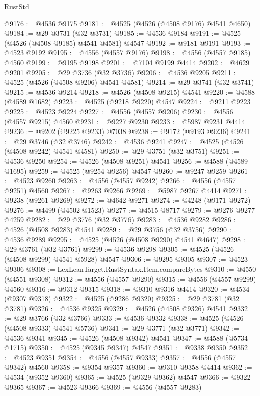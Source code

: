 \begin{lexlean}{RustStd}
\begin{coremodule}
{\begin{coremodule}
{{{{{{{{{{{{{{{{{{{{{{{{{{{{{{{{{{{{{{{{{{{{{{{{{{{{{{{@9176 := @4536 @9175
@9181 := @4525 (@4526 (@4508 @9176) @4541 @4650)
@9184 := @29 @3731 (@32 @3731)
@9185 := @4536 @9184
@9191 := @4525 (@4526 (@4508 @9185) @4541 @4581) @4547
@9192 := @9181 @9191
@9193 := @4523 @9192
@9195 := @4556 (@4557 @9176)
@9198 := @4556 (@4557 @9185) @4560
@9199 := @9195 @9198
@9201 := @7104 @9199 @4414
@9202 := @4629 @9201
@9205 := @29 @3736 (@32 @3736)
@9206 := @4536 @9205
@9211 := @4525 (@4526 (@4508 @9206) @4541 @4581)
@9214 := @29 @3741 (@32 @3741)
@9215 := @4536 @9214
@9218 := @4526 (@4508 @9215) @4541
@9220 := @4588 (@4589 @1682)
@9223 := @4525 (@9218 @9220) @4547
@9224 := @9211 @9223
@9225 := @4523 @9224
@9227 := @4556 (@4557 @9206)
@9230 := @4556 (@4557 @9215) @4560
@9231 := @9227 @9230
@9233 := @5987 @9231 @4414
@9236 := @9202 (@9225 @9233) @7038
@9238 := @9172 (@9193 @9236)
@9241 := @29 @3746 (@32 @3746)
@9242 := @4536 @9241
@9247 := @4525 (@4526 (@4508 @9242) @4541 @4581)
@9250 := @29 @3751 (@32 @3751)
@9251 := @4536 @9250
@9254 := @4526 (@4508 @9251) @4541
@9256 := @4588 (@4589 @1695)
@9259 := @4525 (@9254 @9256) @4547
@9260 := @9247 @9259
@9261 := @4523 @9260
@9263 := @4556 (@4557 @9242)
@9266 := @4556 (@4557 @9251) @4560
@9267 := @9263 @9266
@9269 := @5987 @9267 @4414
@9271 := @9238 (@9261 @9269)
@9272 := @4642 @9271
@9274 := @4248 (@9171 @9272)
@9276 := @4499 (@4502 @1523)
@9277 := @4515 @8717
@9279 := @9276 @9277 @4259
@9282 := @29 @3776 (@32 @3776)
@9283 := @4536 @9282
@9286 := @4526 (@4508 @9283) @4541
@9289 := @29 @3756 (@32 @3756)
@9290 := @4536 @9289
@9295 := @4525 (@4526 (@4508 @9290) @4541 @4647)
@9298 := @29 @3761 (@32 @3761)
@9299 := @4536 @9298
@9305 := @4525 (@4526 (@4508 @9299) @4541 @5928) @4547
@9306 := @9295 @9305
@9307 := @4523 @9306
@9308 := LexLeanTarget.RustSyntax.Item.compareBytes
@9310 := @4550 (@4551 @9308)
@9312 := @4556 (@4557 @9290)
@9315 := @4556 (@4557 @9299) @4560
@9316 := @9312 @9315
@9318 := @9310 @9316 @4414
@9320 := @4534 (@9307 @9318)
@9322 := @4525 (@9286 @9320)
@9325 := @29 @3781 (@32 @3781)
@9326 := @4536 @9325
@9329 := @4526 (@4508 @9326) @4541
@9332 := @29 @3766 (@32 @3766)
@9333 := @4536 @9332
@9338 := @4525 (@4526 (@4508 @9333) @4541 @5736)
@9341 := @29 @3771 (@32 @3771)
@9342 := @4536 @9341
@9345 := @4526 (@4508 @9342) @4541
@9347 := @4588 (@5734 @1715)
@9350 := @4525 (@9345 @9347) @4547
@9351 := @9338 @9350
@9352 := @4523 @9351
@9354 := @4556 (@4557 @9333)
@9357 := @4556 (@4557 @9342) @4560
@9358 := @9354 @9357
@9360 := @9310 @9358 @4414
@9362 := @4534 (@9352 @9360)
@9365 := @4525 (@9329 @9362) @4547
@9366 := @9322 @9365
@9367 := @4523 @9366
@9369 := @4556 (@4557 @9283)
}}}}}}}}}}}}}}}}}}}}}}}}}}}}}}}}}}}}}}}}}}}}}}}}}}}}}}}
\end{coremodule}}
\end{coremodule}
\end{lexlean}
